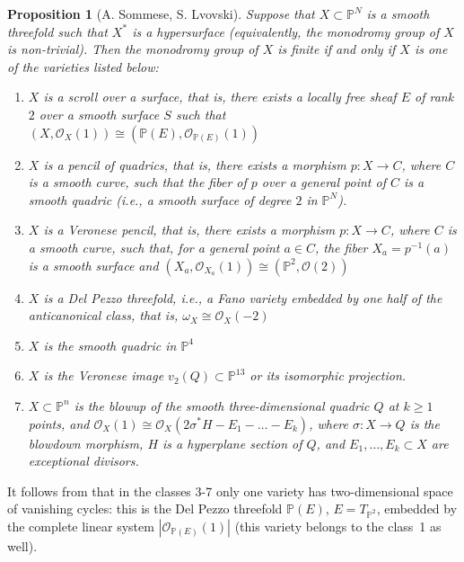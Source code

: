 \documentclass[a4paper]{amsart}
\theoremstyle{plain}
\newtheorem{prop}[theorem]{Proposition}
\theoremstyle{definition}
\begin{document}
\begin{prop}[A. Sommese, S. Lvovski]
    \label{sommese-lvovski}
    Suppose that $X \subset \mathbb P^N$ is a smooth threefold such that $X^*$
 is a hypersurface (equivalently, the monodromy group of $X$ is non-trivial).
 Then the monodromy group of $X$ is finite if and only if $X$ is one of the
 varieties listed below:
    \begin{enumerate}
        \item $X$ is a scroll over a surface, that is, there exists a locally free
        sheaf $E$ of rank $2$ over a smooth surface $S$ such that $(X,\mathcal O_X(1)) \cong (\mathbb P(E),\mathcal O_{\mathbb P(E)}(1))$
        \item $X$ is a pencil of quadrics, that is, there exists a morphism $p\colon X \to C$,
        where $C$ is a smooth curve, such that the fiber of $p$ over a general
        point of $C$ is a smooth quadric (i.e., a smooth surface of degree $2$
        in $\mathbb P^N$).
        \item $X$ is a Veronese pencil, that is, there exists a morphism $p\colon X \to C$, where $C$ is a smooth curve, such that, for a general point $a \in C$,
        the fiber $X_a = p^{-1}(a)$ is a smooth surface and $(X_a,\mathcal O_{X_a}(1)) \cong (\mathbb P^2, \mathcal O(2))$
        \item $X$ is a Del Pezzo threefold, i.e., a Fano variety embedded by one
        half of the anticanonical class, that is, $\omega_X \cong \mathcal O_X(-2)$
        \item $X$ is the smooth quadric in $\mathbb P^4$
        \item $X$ is the Veronese image $v_2(Q) \subset \mathbb P^{13}$ or its isomorphic projection.
        \item $X\subset \mathbb P^n$ is the blowup of the
        smooth three-dimensional quadric $Q$ at $k \geq 1$ points, and $\mathcal O_X(1) \cong \mathcal O_X(2\sigma^*H - E_1 - \dots - E_k)$,
        where $\sigma \colon X \to Q$ is the blowdown
        morphism, $H$ is a hyperplane section of $Q$, and $E_1,\dots ,E_k \subset X$ are
        exceptional divisors.
    \end{enumerate}
\end{prop}
It follows from \cite{Lvovski} that in the classes 3-7 only one variety has two-dimensional space of vanishing cycles: this is the Del Pezzo threefold $\mathbb P(E)$, $E = T_{\mathbb P^2}$, embedded by the complete linear system $|\mathcal O_{\mathbb P(E)}(1)|$ (this variety belongs to the class~1 as well).
\end{document}
